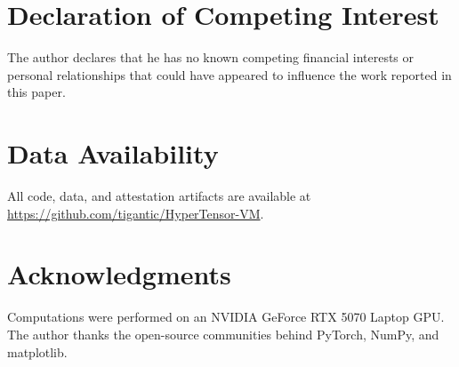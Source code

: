\documentclass[preprint,12pt,authoryear]{elsarticle}
\theoremstyle{definition}
\begin{document}
\section*{Declaration of Competing Interest}

The author declares that he has no known competing financial interests or personal relationships that could have appeared to influence the work reported in this paper.

\section*{Data Availability}

All code, data, and attestation artifacts are available at \url{https://github.com/tigantic/HyperTensor-VM}.

\section*{Acknowledgments}

Computations were performed on an NVIDIA GeForce RTX 5070 Laptop GPU.
The author thanks the open-source communities behind PyTorch, NumPy, and matplotlib.
\end{document}
